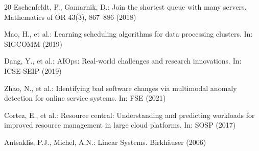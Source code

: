 \documentclass[runningheads]{llncs}
\begin{document}
\begin{thebibliography}{20}
Eschenfeldt, P., Gamarnik, D.: Join the shortest queue with many servers. Mathematics of OR 43(3), 867--886 (2018)

Mao, H., et al.: Learning scheduling algorithms for data processing clusters. In: SIGCOMM (2019)

Dang, Y., et al.: AIOps: Real-world challenges and research innovations. In: ICSE-SEIP (2019)

Zhao, N., et al.: Identifying bad software changes via multimodal anomaly detection for online service systems. In: FSE (2021)

Cortez, E., et al.: Resource central: Understanding and predicting workloads for improved resource management in large cloud platforms. In: SOSP (2017)

Antsaklis, P.J., Michel, A.N.: Linear Systems. Birkh\"{a}user (2006)

\end{thebibliography}
\end{document}
